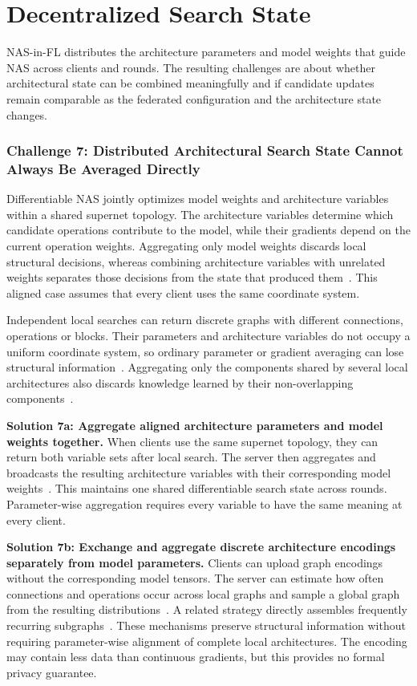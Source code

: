 \section{Decentralized Search State}

NAS-in-FL distributes the architecture parameters and model weights that guide NAS across clients and rounds. The resulting challenges are about whether architectural state can be combined meaningfully and if candidate updates remain comparable as the federated configuration and the architecture state changes.

\subsubsection{Challenge 7: Distributed Architectural Search State Cannot Always Be Averaged Directly}

Differentiable NAS jointly optimizes model weights and architecture variables within a shared supernet topology. The architecture variables determine which candidate operations contribute to the model, while their gradients depend on the current operation weights. Aggregating only model weights discards local structural decisions, whereas combining architecture variables with unrelated weights separates those decisions from the state that produced them~\cite{fednas_2021,dfnas_2020,feathers_2023}. This aligned case assumes that every client uses the same coordinate system.

Independent local searches can return discrete graphs with different connections, operations or blocks. Their parameters and architecture variables do not occupy a uniform coordinate system, so ordinary parameter or gradient averaging can lose structural information~\cite{multi-granular_fednas_2023,efnas_2024}. Aggregating only the components shared by several local architectures also discards knowledge learned by their non-overlapping components~\cite{f2nas_2024}.

\noindent\textbf{Solution 7a: Aggregate aligned architecture parameters and model weights together.} When clients use the same supernet topology, they can return both variable sets after local search. The server then aggregates and broadcasts the resulting architecture variables with their corresponding model weights~\cite{fednas_2021,dfnas_2020,feathers_2023}. This maintains one shared differentiable search state across rounds. Parameter-wise aggregation requires every variable to have the same meaning at every client.

\noindent\textbf{Solution 7b: Exchange and aggregate discrete architecture encodings separately from model parameters.} Clients can upload graph encodings without the corresponding model tensors. The server can estimate how often connections and operations occur across local graphs and sample a global graph from the resulting distributions~\cite{multi-granular_fednas_2023}. A related strategy directly assembles frequently recurring subgraphs~\cite{efnas_2024}. These mechanisms preserve structural information without requiring parameter-wise alignment of complete local architectures. The encoding may contain less data than continuous gradients, but this provides no formal privacy guarantee.

